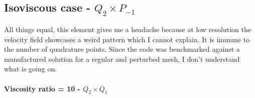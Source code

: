 \newpage
\subsection*{Isoviscous case - $Q_2\times P_{-1}$}

All things equal, this element gives me a headache because at low resolution the velocity
field showcases a weird pattern which I cannot explain. It is immune to the number of quadrature points. 
Since the code was benchmarked against a manufactured solution for a regular and perturbed 
mesh, I don't understand what is going on.










\newpage
\paragraph{Viscosity ratio = 10 - $Q_2\times Q_1$}


